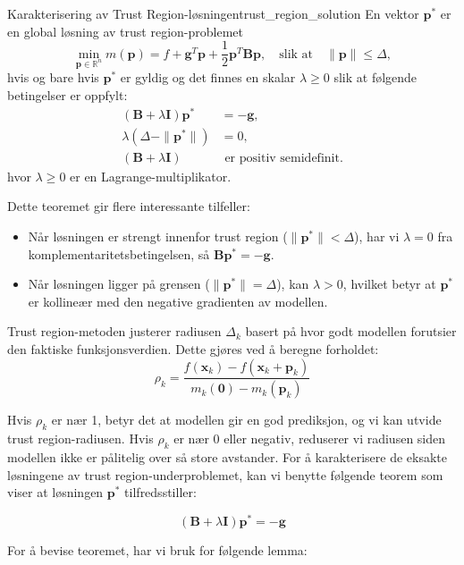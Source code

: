 \begin{theorem}{Karakterisering av Trust Region-løsningen}{trust_region_solution}
	En vektor $\symbf{p}^\ast$ er en global løsning av trust region-problemet
	\[
		\min_{\symbf{p} \in \mathbb{R}^n} m(\symbf{p}) = f + \symbf{g}^T\symbf{p} + \frac{1}{2}\symbf{p}^T\symbf{B}\symbf{p}, \quad \text{slik at} \quad \|\symbf{p}\| \leq \Delta,
	\]
	hvis og bare hvis $\symbf{p}^\ast$ er gyldig og det finnes en skalar $\lambda \geq 0$ slik at følgende betingelser er oppfylt:
	\begin{align}
		(\symbf{B} + \lambda\symbf{I})\symbf{p}^\ast & = -\symbf{g},                   \\
		\lambda(\Delta - \|\symbf{p}^\ast\|)         & = 0,                            \\
		(\symbf{B} + \lambda\symbf{I})            & \text{ er positiv semidefinit.}
	\end{align}
	hvor $\lambda \geq 0$ er en Lagrange-multiplikator.
\end{theorem}

Dette teoremet gir flere interessante tilfeller:
\begin{itemize}
	\item Når løsningen er strengt innenfor trust region ($\|\symbf{p}^\ast\| < \Delta$), har vi $\lambda = 0$ fra komplementaritetsbetingelsen, så $\symbf{B}\symbf{p}^\ast = -\symbf{g}$.
	\item Når løsningen ligger på grensen ($\|\symbf{p}^\ast\| = \Delta$), kan $\lambda > 0$, hvilket betyr at $\symbf{p}^\ast$ er kollineær med den negative gradienten av modellen.
\end{itemize}

Trust region-metoden justerer radiusen $\Delta_k$ basert på hvor godt modellen forutsier den faktiske funksjonsverdien. Dette gjøres ved å beregne forholdet:
\[
	\rho_k = \frac{f(\symbf{x}_k) - f(\symbf{x}_k + \symbf{p}_k)}{m_k(\symbf{0}) - m_k(\symbf{p}_k)}
\]

Hvis $\rho_k$ er nær 1, betyr det at modellen gir en god prediksjon, og vi kan utvide trust region-radiusen. Hvis $\rho_k$ er nær 0 eller negativ, reduserer vi radiusen siden modellen ikke er pålitelig over så store avstander.
For å karakterisere de eksakte løsningene av trust region-underproblemet, kan vi benytte følgende teorem som viser at løsningen $\symbf{p}^\ast$ tilfredsstiller:

\[
	(\symbf{B} + \lambda \symbf{I})\symbf{p}^\ast = -\symbf{g}
\]

For å bevise teoremet, har vi bruk for følgende lemma:

